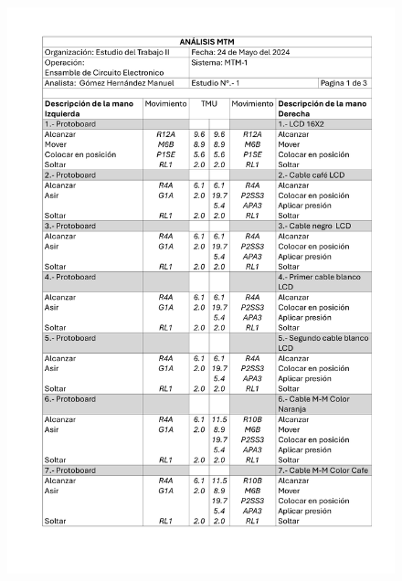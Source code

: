 \begin{figure}[H]
    \centering
    \includegraphics[scale=0.2]{15/img/tablaMTM1-1.pdf}
    \centering

\end{figure}

